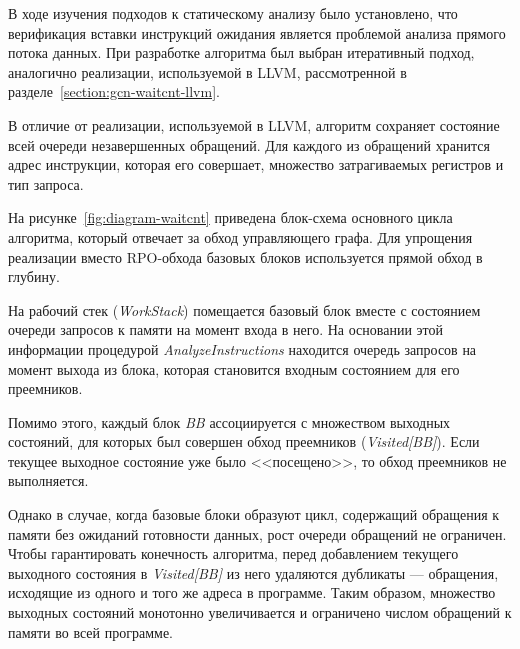 \documentclass[a4paper,14pt]{extarticle}
\begin{document}
{В ходе изучения подходов к статическому анализу было установлено, что верификация
вставки инструкций ожидания является проблемой анализа прямого потока данных.
При разработке алгоритма был выбран итеративный подход, аналогично реализации,
используемой в LLVM, рассмотренной в разделе~\ref{section:gcn-waitcnt-llvm}.

В отличие от реализации, используемой в LLVM, алгоритм сохраняет состояние всей очереди
незавершенных обращений. Для каждого из обращений хранится адрес инструкции, которая его
совершает, множество затрагиваемых регистров и тип запроса.

На рисунке~\ref{fig:diagram-waitcnt} приведена блок-схема основного цикла
алгоритма, который отвечает за обход управляющего графа. Для упрощения реализации
вместо RPO-обхода базовых блоков используется прямой обход в глубину.

На рабочий стек (\textit{WorkStack}) помещается базовый блок вместе с состоянием
очереди запросов к памяти на момент входа в него. На основании этой информации
процедурой \textit{AnalyzeInstructions} находится очередь запросов на момент
выхода из блока, которая становится входным состоянием для его преемников.

Помимо этого, каждый блок \textit{BB} ассоциируется с множеством выходных состояний,
для которых был совершен обход преемников (\textit{Visited[BB]}). Если текущее выходное
состояние уже было <<посещено>>, то обход преемников не выполняется.

Однако в случае, когда базовые блоки образуют цикл, содержащий обращения к памяти без ожиданий
готовности данных, рост очереди обращений не ограничен. Чтобы гарантировать конечность
алгоритма, перед добавлением текущего выходного состояния в \textit{Visited[BB]} из него
удаляются дубликаты — обращения, исходящие из одного и того же адреса в программе. Таким образом,
множество выходных состояний монотонно увеличивается и ограничено числом обращений к памяти
во всей программе.

}
\end{document}
